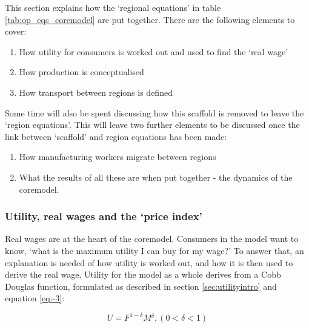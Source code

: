 This section explains how the `regional equations' in table \ref{tab:op_eqs_coremodel} are put together. There are the following elements to cover: 

\begin{enumerate}
	\item How utility for consumers is worked out and used to find the `real wage'
	\item How production is conceptualised
	\item How transport between regions is defined
\end{enumerate}

Some time will also be spent discussing how this scaffold is removed to leave the `region equations'. This will leave two further elements to be discussed once the link between `scaffold' and region equations has been made:

\begin{enumerate}
	\item How manufacturing workers migrate between regions
	\item What the results of all these are when put together - the dynamics of the \gls{coremodel}.
\end{enumerate}

\subsubsection{Utility, real wages and the `price index'}

Real wages are at the heart of the \gls{coremodel}. Consumers in the model want to know, `what is the maximum utility I can buy for my wage?' To answer that, an explanation is needed of how utility is worked out, and how it is then used to derive the real wage. Utility for the model as a whole derives from a Cobb Douglas function, formulated as described in section \ref{sec:utilityintro} and equation \eqref{eq:-3}:

\begin{equation}
U=F^{1-\delta}M{}^{\delta},(0<\delta<1)
\end{equation}


